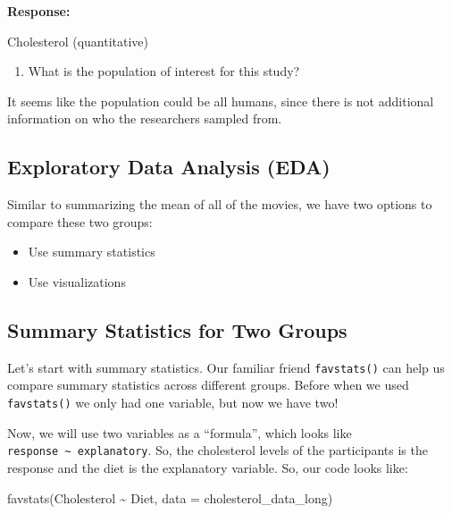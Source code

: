 \documentclass[
  letterpaper,
  DIV=11,
  numbers=noendperiod]{scrartcl}
\newenvironment{Shaded}{\begin{snugshade}}{\end{snugshade}}
\newcommand{\AttributeTok}[1]{\textcolor[rgb]{0.40,0.45,0.13}{#1}}
\newcommand{\FunctionTok}[1]{\textcolor[rgb]{0.28,0.35,0.67}{#1}}
\newcommand{\NormalTok}[1]{\textcolor[rgb]{0.00,0.23,0.31}{#1}}
\newcommand{\SpecialCharTok}[1]{\textcolor[rgb]{0.37,0.37,0.37}{#1}}
\providecommand{\tightlist}{%
  \setlength{\itemsep}{0pt}\setlength{\parskip}{0pt}}\usepackage{longtable,booktabs,array}
\begin{document}
\textbf{Response:}

Cholesterol (quantitative)

\begin{enumerate}
\def\labelenumi{\arabic{enumi}.}
\setcounter{enumi}{2}
\tightlist
\item
  What is the population of interest for this study?
\end{enumerate}

It seems like the population could be all humans, since there is not
additional information on who the researchers sampled from.

\hypertarget{exploratory-data-analysis-eda}{%
\subsection{Exploratory Data Analysis
(EDA)}\label{exploratory-data-analysis-eda}}

Similar to summarizing the mean of all of the movies, we have two
options to compare these two groups:

\begin{itemize}
\tightlist
\item
  Use summary statistics
\item
  Use visualizations
\end{itemize}

\hypertarget{summary-statistics-for-two-groups}{%
\subsection{Summary Statistics for Two
Groups}\label{summary-statistics-for-two-groups}}

Let's start with summary statistics. Our familiar friend
\texttt{favstats()} can help us compare summary statistics across
different groups. Before when we used \texttt{favstats()} we only had
one variable, but now we have two!

Now, we will use two variables as a ``formula'', which looks like
\texttt{response\ \textasciitilde{}\ explanatory}. So, the cholesterol
levels of the participants is the response and the diet is the
explanatory variable. So, our code looks like:

\begin{Shaded}
\begin{Highlighting}[]
\FunctionTok{favstats}\NormalTok{(Cholesterol }\SpecialCharTok{\textasciitilde{}}\NormalTok{ Diet, }
         \AttributeTok{data =}\NormalTok{ cholesterol\_data\_long)}
\end{Highlighting}
\end{Shaded}
\end{document}
